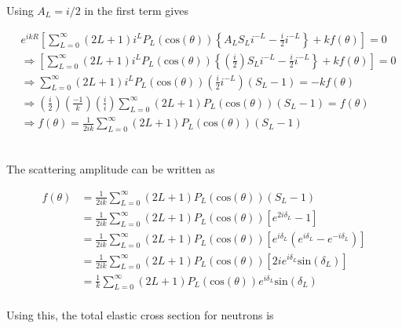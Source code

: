 \documentclass[paper=a4, fontsize=11pt]{scrartcl} %
\numberwithin{equation}{section} %
\numberwithin{figure}{section} %
\numberwithin{table}{section} %
\begin{document}
Using $A_{L}=i/2$ in the first term gives

\begin{align*}
&e^{ikR}\left[ \sum_{L=0}^{\infty}(2L+1)i^{L}P_{L}(\textrm{cos}(\theta)) \left\{A_{L}S_{L}i^{-L}-\frac{i}{2}i^{-L}\right\}+kf(\theta) \right]=0\\
&\Rightarrow \left[ \sum_{L=0}^{\infty}(2L+1)i^{L}P_{L}(\textrm{cos}(\theta)) \left\{\left(\frac{i}{2}\right)S_{L}i^{-L}-\frac{i}{2}i^{-L}\right\}+kf(\theta) \right]=0\\
&\Rightarrow \sum_{L=0}^{\infty}(2L+1)i^{L}P_{L}(\textrm{cos}(\theta))\left(\frac{i}{2}i^{-L}\right)(S_{L}-1) = -kf(\theta)\\
&\Rightarrow \left(\frac{i}{2}\right)\left(\frac{-1}{k}\right)\left(\frac{i}{i}\right)\sum_{L=0}^{\infty}(2L+1)P_{L}(\textrm{cos}(\theta))(S_{L}-1) = f(\theta)\\
&\Rightarrow f(\theta)=\frac{1}{2ik}\sum_{L=0}^{\infty}(2L+1)P_{L}(\textrm{cos}(\theta))(S_{L}-1)\\
\end{align*}

\subsection{}

The scattering amplitude can be written as

\begin{align*}
f(\theta)&=\frac{1}{2ik} \sum_{L=0}^{\infty} (2L+1)P_{L}(\textrm{cos}(\theta))(S_{L}-1)\\
&=\frac{1}{2ik} \sum_{L=0}^{\infty} (2L+1)P_{L}(\textrm{cos}(\theta))\left[ e^{2i\delta_{L}}-1\right]\\
&=\frac{1}{2ik} \sum_{L=0}^{\infty} (2L+1)P_{L}(\textrm{cos}(\theta))\left[ e^{i\delta_{L}}(e^{i\delta_{L}}-e^{-i\delta_{L}})\right]\\
&=\frac{1}{2ik} \sum_{L=0}^{\infty} (2L+1)P_{L}(\textrm{cos}(\theta))\left[ 2ie^{i\delta_{L}}\textrm{sin}(\delta_{L})\right]\\
&=\frac{1}{k} \sum_{L=0}^{\infty} (2L+1)P_{L}(\textrm{cos}(\theta))e^{i\delta_{L}}\textrm{sin}(\delta_{L})\\
\end{align*}

Using this, the total elastic cross section for neutrons is 
\end{document}
